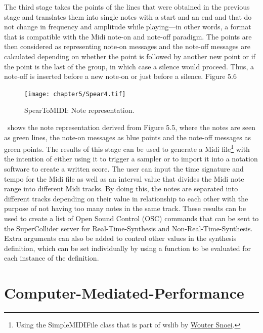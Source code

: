 The third stage takes the points of the lines that were obtained in the previous stage and translates them into single notes with a start and an end and that do not change in frequency and amplitude while playing---in other words, a format that is compatible with the Midi note-on and note-off paradigm. The points are then considered as representing note-on messages and the note-off messages are calculated depending on whether the point is followed by another new point or if the point is the last of the group, in which case a silence would proceed. Thus, a note-off is inserted before a new note-on or just before a silence. Figure 5.6 
\begin{figure}[htbp] %
   \centering
   \texttt{[image: chapter5/Spear4.tif]} %
   \caption{SpearToMIDI: Note representation.}
   \label{fig:example}
\end{figure}\
shows the note representation derived from Figure 5.5, where the notes are seen as green lines, the note-on messages as blue points and the note-off messages as green points.\hypertarget{wlib}{} The results of this stage can be used to generate a Midi file\footnote{Using the SimpleMIDIFile class that is part of wslib by \href{http://www.woutersnoei.nl/}{Wouter Snoei}.} with the intention of either using it to trigger a sampler or to import it into a notation software to create a written score. The user can input the time signature and tempo for the Midi file as well as an interval value that divides the Midi note range into different Midi tracks. By doing this, the notes are separated into different tracks depending on their value in relationship to each other with the purpose of not having too many notes in the same track. These results can be used to create a list of Open Sound Control (OSC) commands that can be sent to the SuperCollider server for Real-Time-Synthesis and Non-Real-Time-Synthesis. Extra arguments can also be added to control other values in the synthesis definition, which can be set individually by using a function to be evaluated for each instance of the definition.

\section{Computer-Mediated-Performance}

